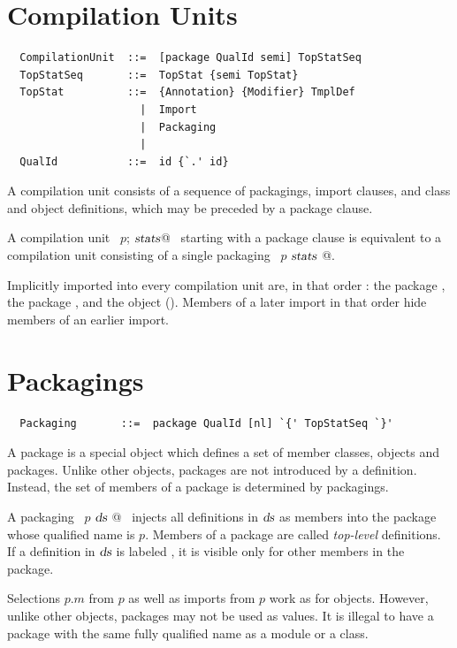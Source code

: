 \section{Compilation Units}

\syntax\begin{lstlisting}
  CompilationUnit  ::=  [package QualId semi] TopStatSeq
  TopStatSeq       ::=  TopStat {semi TopStat}
  TopStat          ::=  {Annotation} {Modifier} TmplDef
                     |  Import
                     |  Packaging
                     |
  QualId           ::=  id {`.' id}
\end{lstlisting}

A compilation unit consists of a sequence of packagings, import
clauses, and class and object definitions, which may be preceded by a
package clause.

A compilation unit ~\lstinline@package $p$; $\mbox{\sl stats}$@~ starting with a package
clause is equivalent to a compilation unit consisting of a single
packaging ~\lstinline@package $p$ { $\mbox{\sl stats}$ }@.

Implicitly imported into every compilation unit are, in that order :
the package , the package , and the object
 (). Members of a later import in
that order hide members of an earlier import.

\section{Packagings}\label{sec:packagings}

\syntax\begin{lstlisting}
  Packaging       ::=  package QualId [nl] `{' TopStatSeq `}'
\end{lstlisting}

A package is a special object which defines a set of member classes,
objects and packages.  Unlike other objects, packages are not introduced
by a definition.  Instead, the set of members of a package is determined by
packagings.

A packaging ~\lstinline@package $p$ { $\mbox{\sl ds}$ }@~ injects all
definitions in $\mbox{\sl ds}$ as members into the package whose qualified name
is $p$. Members of a package are called {\em top-level} definitions.
If a definition in $\mbox{\sl ds}$ is labeled , it is
visible only for other members in the package.

Selections $p$.$m$ from $p$ as well as imports from $p$
work as for objects. However, unlike other objects, packages may not
be used as values. It is illegal to have a package with the same fully
qualified name as a module or a class.

